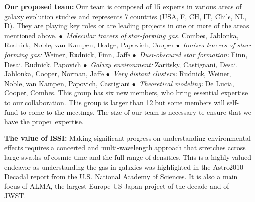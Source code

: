 \documentclass[11pt]{article}
\begin{document}

\textbf{Our proposed team:} Our team is composed of 15 experts in various areas of galaxy evolution studies and
represents 7 countries (USA, F, CH, IT, Chile, NL, D).  They are playing key roles or are leading
projects in one or more of the areas mentioned
above. $\bullet$~\textit{Molecular tracers of star-forming gas:} Combes, Jablonka, Rudnick, Noble, van Kampen, Hodge, Papovich, Cooper
$\bullet$~\textit{Ionized tracers of star-forming gas:} Weiner, Rudnick, Finn, Jaffe 
 $\bullet$~\textit{Dust-obscured star formation:} Finn, Desai, Rudnick, Papovich
$\bullet$~\textit{Galaxy environment:}  Zaritsky, Castignani, Desai, Jablonka, Cooper, Norman, Jaffe $\bullet$~\textit{Very distant clusters:} Rudnick, Weiner, Noble, van Kampen, Papovich, Castigiani $\bullet$~\textit{Theoretical modeling:} De Lucia, Cooper, Combes. This group has six new members, who bring essential expertise to our collaboration.  This group is larger than 12 but  some members will self-fund to come to the meetings.  The size of our team is necessary to ensure that we have the proper~expertise.

\textbf{The value of ISSI:}  
Making significant progress on understanding environmental effects requires a concerted and
multi-wavelength approach that stretches across large swaths of cosmic
time and the full range of densities.  This is a highly valued endeavor as understanding the gas in
galaxies was highlighted in the Astro2010 Decadal report from the
U.S. National Academy of Sciences.  It is also a main focus of ALMA,
the largest Europe-US-Japan project of the decade and of JWST.  
\end{document}
